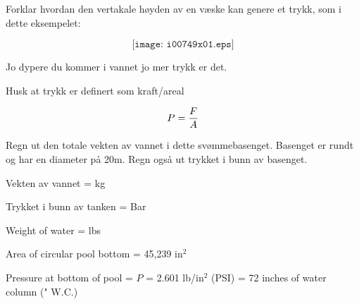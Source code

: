 

Forklar hvordan den vertakale høyden av en væske kan genere et trykk, som i dette eksempelet:

$$\texttt{[image: i00749x01.eps]}$$

Jo dypere du kommer i vannet jo mer trykk er det. 

\vskip 10pt

Husk at trykk er definert som kraft/areal

$$P = {F \over A}$$

Regn ut den totale vekten av vannet i dette svømmebasenget. Basenget er rundt og har en diameter på 20m. Regn også ut trykket i bunn av basenget. 

\vskip 10pt

Vekten av vannet = \underbar{\hskip 50pt} kg

\vskip 10pt

Trykket i bunn av tanken = \underbar{\hskip 50pt} Bar

\vskip 10pt







Weight of water =  lbs

\vskip 10pt

Area of circular pool bottom = 45,239 in$^{2}$

\vskip 10pt

Pressure at bottom of pool = $P$ = 2.601 lb/in$^{2}$ (PSI) = 72 inches of water column (" W.C.)

\vskip 10pt












